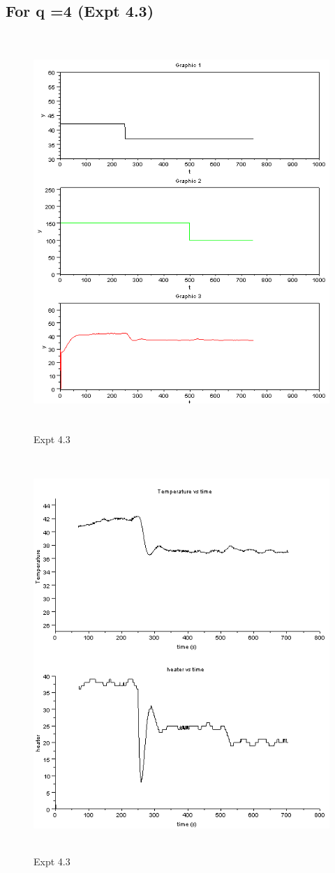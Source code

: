 \subsection{For q =4 (Expt 4.3) }
\begin{figure}[H]
  \includegraphics[width=12cm, height=15cm]{mpc/4_3.PNG}
  \caption{Expt 4.3}
\end{figure}
\begin{figure}[H]
  \includegraphics[width=12cm, height=15cm]{mpc/4_3_heater_final.png}
  \caption{Expt 4.3}
\end{figure}



